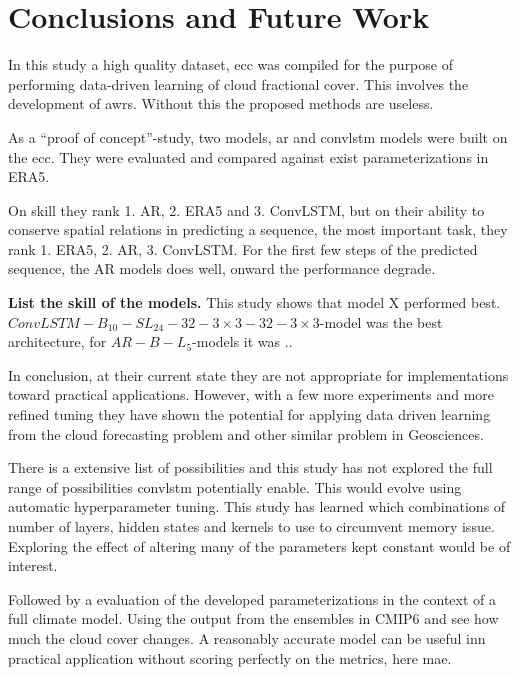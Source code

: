 \chapter{Conclusions and Future Work}
In this study a high quality dataset, \acrfull{ecc} was compiled for the purpose of performing data-driven learning of cloud fractional cover. This involves the development of \acrfull{awrs}. Without this the proposed methods are useless.
 
As a ``proof of concept''-study, two models, \acrfull{ar} and \acrfull{convlstm} models were built on the \acrshort{ecc}. They were evaluated and compared against exist parameterizations in ERA5. 

On skill they rank 1. AR, 2. ERA5 and 3. ConvLSTM, but on their ability to conserve spatial relations in predicting a sequence, the most important task, they rank 1. ERA5, 2. AR, 3. ConvLSTM.
For the first few steps of the predicted sequence, the AR models does well, onward the performance degrade.

\textbf{List the skill of the models.}
This study shows that model X performed best. $ConvLSTM-B_{10}-SL_{24}-32-3\times3-32-3 \times3$-model was the best architecture, for $AR-B-L_5$-models it was ..

In conclusion, at their current state they are not appropriate for implementations toward practical applications. However, with a few more experiments and more refined tuning they have shown the potential for applying data driven learning from the cloud forecasting problem and other similar problem in Geosciences. 

There is a extensive list of possibilities and this study has not explored the full range of possibilities \acrshort{convlstm} potentially enable. 
This would evolve using automatic hyperparameter tuning. This study has learned which combinations of number of layers, hidden states and kernels to use to circumvent memory issue. Exploring the effect of altering many of the parameters kept constant would be of interest.

Followed by a evaluation of the developed parameterizations in the context of a full climate model. Using the output from the ensembles in CMIP6 and see how much the cloud cover changes. A reasonably accurate model can be useful inn practical application without scoring perfectly on the metrics, here \acrshort{mae}.

